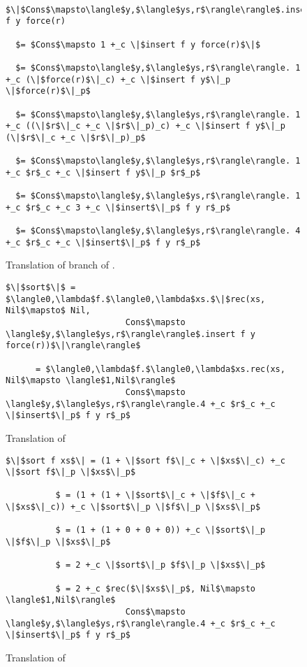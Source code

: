 \begin{figure}[H]
  \caption{Translation of  branch of .}
  \label{fig:sort_cons}
  \begin{lstlisting}
  $\|$Cons$\mapsto\langle$y,$\langle$ys,r$\rangle\rangle$.insert f y force(r)

  $= $Cons$\mapsto 1 +_c \|$insert f y force(r)$\|$

  $= $Cons$\mapsto\langle$y,$\langle$ys,r$\rangle\rangle. 1 +_c (\|$force(r)$\|_c) +_c \|$insert f y$\|_p \|$force(r)$\|_p$

  $= $Cons$\mapsto\langle$y,$\langle$ys,r$\rangle\rangle. 1 +_c ((\|$r$\|_c +_c \|$r$\|_p)_c) +_c \|$insert f y$\|_p (\|$r$\|_c +_c \|$r$\|_p)_p$

  $= $Cons$\mapsto\langle$y,$\langle$ys,r$\rangle\rangle. 1 +_c $r$_c +_c \|$insert f y$\|_p $r$_p$

  $= $Cons$\mapsto\langle$y,$\langle$ys,r$\rangle\rangle. 1 +_c $r$_c +_c 3 +_c \|$insert$\|_p$ f y r$_p$

  $= $Cons$\mapsto\langle$y,$\langle$ys,r$\rangle\rangle. 4 +_c $r$_c +_c \|$insert$\|_p$ f y r$_p$

  \end{lstlisting}
\end{figure}

\begin{figure}[H]
\caption{Translation of }
\label{fig:sort}
\begin{lstlisting}
$\|$sort$\|$ = $\langle0,\lambda$f.$\langle0,\lambda$xs.$\|$rec(xs, Nil$\mapsto$ Nil,
                        Cons$\mapsto \langle$y,$\langle$ys,r$\rangle\rangle$.insert f y force(r))$\|\rangle\rangle$

      = $\langle0,\lambda$f.$\langle0,\lambda$xs.rec(xs, Nil$\mapsto \langle$1,Nil$\rangle$
                        Cons$\mapsto \langle$y,$\langle$ys,r$\rangle\rangle.4 +_c $r$_c +_c \|$insert$\|_p$ f y r$_p$
\end{lstlisting}
\end{figure}

\begin{figure}[H]
\caption{Translation of }
\label{fig:sort_applied}
\begin{lstlisting}
$\|$sort f xs$\| = (1 + \|$sort f$\|_c + \|$xs$\|_c) +_c \|$sort f$\|_p \|$xs$\|_p$

          $ = (1 + (1 + \|$sort$\|_c + \|$f$\|_c + \|$xs$\|_c)) +_c \|$sort$\|_p \|$f$\|_p \|$xs$\|_p$

          $ = (1 + (1 + 0 + 0 + 0)) +_c \|$sort$\|_p \|$f$\|_p \|$xs$\|_p$

          $ = 2 +_c \|$sort$\|_p $f$\|_p \|$xs$\|_p$

          $ = 2 +_c $rec($\|$xs$\|_p$, Nil$\mapsto \langle$1,Nil$\rangle$
                        Cons$\mapsto \langle$y,$\langle$ys,r$\rangle\rangle.4 +_c $r$_c +_c \|$insert$\|_p$ f y r$_p$
\end{lstlisting}
\end{figure}


